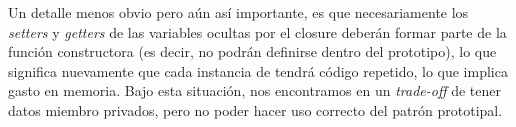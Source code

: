 Un detalle menos obvio pero aún así importante, es que necesariamente los \textit{setters} y \textit{getters} de las variables ocultas por el closure deberán formar parte de la función constructora (es decir, no podrán definirse dentro del prototipo), lo que significa nuevamente que cada instancia de  tendrá código repetido, lo que implica gasto en memoria. Bajo esta situación, nos encontramos en un \textit{trade-off} de tener datos miembro privados, pero no poder hacer uso correcto del patrón prototipal.
